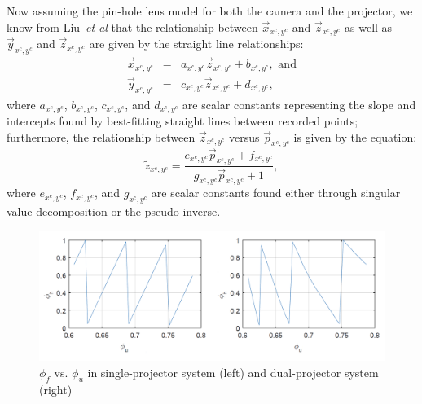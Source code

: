 \documentclass[]{spie}  %
\begin{document}
Now assuming the pin-hole lens model for both the camera and the projector, we know from Liu~\textit{et al} that the relationship between $\vec{x}_{x^c, y^c}$ and $\vec{z}_{x^c, y^c}$ as well as $\vec{y}_{x^c, y^c}$ and $\vec{z}_{x^c, y^c}$ are given by the straight line relationships:
\begin{eqnarray}
\vec{x}_{x^c, y^c} & = & a_{x^c, y^c} \vec{z}_{x^c, y^c} + b_{x^c, y^c}, \mbox{ and} \\
\vec{y}_{x^c, y^c} & = & c_{x^c, y^c} \vec{z}_{x^c, y^c} + d_{x^c, y^c},
\label{pinHoleEqnXY}
\end{eqnarray}
where $a_{x^c, y^c}$, $b_{x^c, y^c}$, $c_{x^c, y^c}$, and $d_{x^c, y^c}$ are scalar constants representing the slope and intercepts found by best-fitting straight lines between recorded points; furthermore, the relationship between $\vec{z}_{x^c, y^c}$ versus $\vec{p}_{x^c, y^c}$ is given by the equation:
\begin{equation}
\tilde{z}_{x^c, y^c} = \frac{e_{x^c, y^c} \vec{p}_{x^c, y^c} + f_{x^c, y^c}}{g_{x^c, y^c} \vec{p}_{x^c, y^c} + 1},
\label{pinHoleEqnPZ}
\end{equation}
where $e_{x^c, y^c}$, $f_{x^c, y^c}$, and $g_{x^c, y^c}$ are scalar constants found either through singular value decomposition or the pseudo-inverse. 


\begin{figure}[!t]
  \includegraphics[width=\linewidth]{phase.png}
  \caption{$\phi_f$ vs. $\phi_u$ in single-projector system (left) and dual-projector system (right)}
  \label{Fig:3}
\end{figure}
\end{document}
